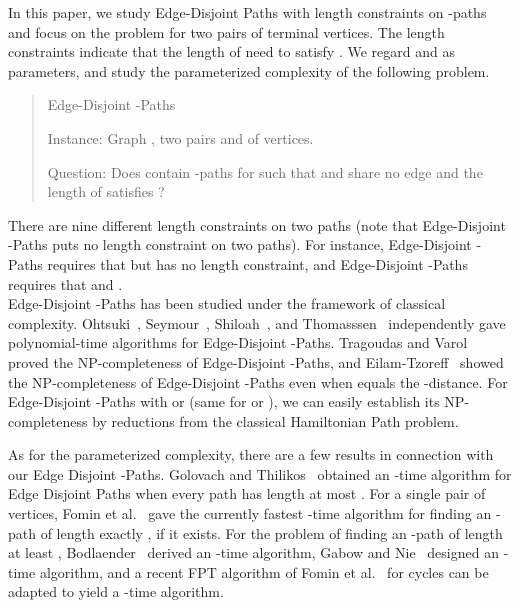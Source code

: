 \documentclass{llncs}
\begin{document}
In this paper, we study {\sc Edge-Disjoint Paths} with length constraints  on 
-paths  and focus on the problem for two pairs of terminal vertices.
The length constraints  indicate
that the length of  need to satisfy .
We regard  and  as parameters, and study the parameterized complexity 
of the following problem.

\begin{quote}
	{\sc Edge-Disjoint -Paths}
	
	{\sc Instance}: Graph , two pairs  and  of vertices.
	
	{\sc Question}: Does  contain -paths  for  
	such that  and  share no edge and the length of  satisfies ?
\end{quote}

There are nine different length constraints on two paths 
(note that {\sc Edge-Disjoint -Paths} puts no length constraint on two paths). 
For instance, {\sc Edge-Disjoint -Paths}
requires that  but  has no length constraint,
and {\sc Edge-Disjoint -Paths} requires that  and . \\

 {\sc Edge-Disjoint -Paths} has been studied 
under the framework of classical complexity. 
Ohtsuki~\cite{ohtsuki1980two}, Seymour~\cite{seymour1980disjoint}, 
Shiloah~\cite{shiloach1980polynomial}, and Thomasssen~\cite{thomassen19802} independently 
gave polynomial-time algorithms for {\sc Edge-Disjoint -Paths}.
Tragoudas and Varol~\cite{tragoudas1997computing} proved the NP-completeness of
{\sc Edge-Disjoint -Paths},
and Eilam-Tzoreff~\cite{eilam1998disjoint} showed the NP-completeness of
{\sc Edge-Disjoint -Paths} even when  equals the -distance.
For {\sc Edge-Disjoint -Paths} with  or  
(same for  or ), we can easily establish its NP-completeness by 
reductions from the classical {\sc Hamiltonian Path} problem.

As for the parameterized complexity, there are a few results in connection with our
{\sc Edge Disjoint -Paths}.
Golovach and Thilikos~\cite{golovach2011paths} obtained an -time
algorithm
for {\sc Edge Disjoint Paths} when every path has length at most .
For a single pair  of vertices, Fomin et al.~\cite{fomin2014efficient}
gave the currently fastest -time algorithm for finding
an -path of length exactly , if it exists.
For the problem of finding an -path of length at least ,
Bodlaender~\cite{bodlaender1993linear} derived an -time algorithm,
Gabow and Nie~\cite{gabow2008finding} designed an -time algorithm,
and a recent FPT algorithm of Fomin et al.~\cite{fomin2014efficient} for cycles
can be adapted to yield a -time algorithm. \\
\end{document}
